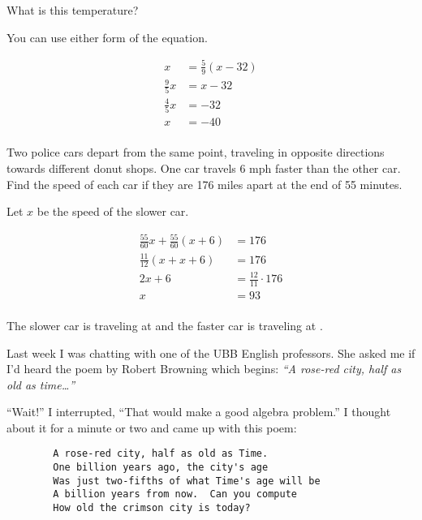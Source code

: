 \documentclass[letterpaper]{exam}
\begin{document}
\begin{questions}
\begin{parts}
          What is this temperature?

      \begin{solution}
        You can use either form of the equation.

        \begin{align*}
          x             & = \frac{5}{9} (x - 32) \\
          \frac{9}{5} x & = x - 32 \\
          \frac{4}{5} x & = -32 \\
          x             & = -40 \\
        \end{align*}
      \end{solution}

      \end{parts}

    \question{}
      Two police cars depart from the same point, traveling in opposite directions towards different donut shops. One
      car travels 6 mph faster than the other car.  Find the speed of each car if they are 176 miles apart at the end of
      55 minutes.

      \begin{solution}
        Let $x$ be the speed of the slower car.

        \begin{align*}
          \frac{55}{60} x + \frac{55}{60}(x + 6) & = 176 \\
          \frac{11}{12} (x + x + 6)              & = 176 \\
          2x + 6                                 & = \frac{12}{11} \cdot 176 \\
          x                                      & = 93 \\
        \end{align*}

        The slower car is traveling at  and the faster car is traveling at .

      \end{solution}
    \question{}
      Last week I was chatting with one of the UBB English professors.  She asked me if I'd heard the poem by Robert
      Browning which begins: {\em ``A rose-red city, half as old as time\ldots ''\/}

      ``Wait!'' I interrupted,  ``That would make a good algebra problem.''  I thought about it for a minute or two and
      came up with this poem:

      \begin{verbatim}
        A rose-red city, half as old as Time.
        One billion years ago, the city's age
        Was just two-fifths of what Time's age will be
        A billion years from now.  Can you compute
        How old the crimson city is today?
      \end{verbatim}


\end{questions}
\end{document}
